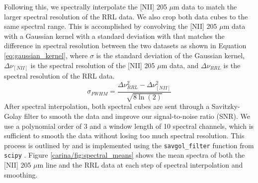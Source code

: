 Following this, we spectrally interpolate the [NII] 205 $\mu$m data to match the larger spectral resolution of the RRL data.
We also crop both data cubes to the same spectral range. 
This is accomplished by convolving the [NII] 205 $\mu$m data with a Gaussian kernel with a standard deviation with that matches the difference in spectral resolution between the two datasets as shown in Equation \ref{eq:gaussian_kernel}, where $\sigma$ is the standard deviation of the Gaussian kernel, $\Delta \nu_{[NII]}$ is the spectral resolution of the [NII] 205 $\mu$m data, and $\Delta \nu_{RRL}$ is the spectral resolution of the RRL data.
\begin{equation}
    \sigma_{FWHM} = \frac{\Delta \nu_{RRL}^2 - \Delta \nu_{[NII]}^2}{\sqrt{8\ln(2)}}
    \label{eq:gaussian_kernel}
\end{equation}
After spectral interpolation, both spectral cubes are sent through a Savitzky-Golay filter to smooth the data and improve our signal-to-noise ratio (SNR). 
We use a polynomial order of 3 and a window length of 10 spectral channels, which is sufficient to smooth the data without losing too much spectral resolution. 
This process is outlined by \cite{pineda2019electron} and is implemented using the \texttt{savgol\_filter} function from \texttt{scipy} \citep{2020SciPy-NMeth}.
Figure \ref{carina/fig:spectral_means} shows the mean spectra of both the [NII] 205 $\mu$m line and the RRL data at each step of spectral interpolation and smoothing.

